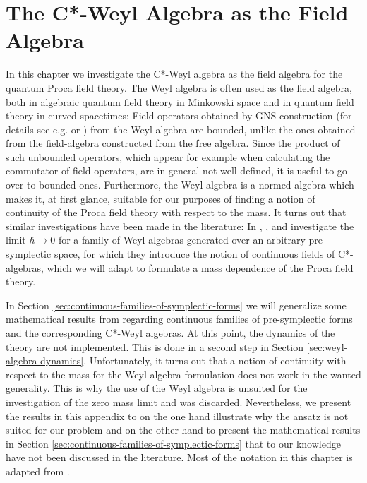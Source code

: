 \section{The C*-Weyl Algebra as the Field Algebra}\label{app:weyl-algebra}
In this chapter we investigate the C*-Weyl algebra as the field algebra for the quantum Proca field theory.  The Weyl algebra is often used as the field algebra, both in algebraic quantum field theory in Minkowski space and in quantum field theory in curved spacetimes: Field operators obtained by GNS-construction (for details see e.g. \cite[Chapter III.]{haag} or \cite[Chapter III.14]{fragoulopoulou}) from the Weyl algebra are bounded, unlike the ones obtained from the field-algebra constructed from the free algebra. Since the product of such unbounded operators, which appear for example when calculating the commutator of field operators, are in general not well defined, it is useful to go over to bounded ones. Furthermore, the Weyl algebra is a normed algebra which makes it, at first glance, suitable for our purposes of finding a notion of continuity of the Proca field theory with respect to the mass. It turns out that similar investigations have been made in the literature:  In \cite{rieckers_honegger_deformation}, ,  and  investigate the limit $\hbar \to 0$ for a family of Weyl algebras generated over an arbitrary pre-symplectic space, for which they introduce the notion of continuous fields of C*-algebras, which we will adapt to formulate a mass dependence of the Proca field theory.\par
%
In Section \ref{sec:continuous-families-of-symplectic-forms} we will generalize some mathematical results from \cite{rieckers_honegger_deformation} regarding continuous families of pre-symplectic forms and the corresponding C*-Weyl algebras. At this point, the dynamics of the theory are not implemented. This is done in a second step in Section \ref{sec:weyl-algebra-dynamics}. Unfortunately, it turns out that a notion of continuity with respect to the mass for the Weyl algebra formulation does not work in the wanted generality. This is why the use of the Weyl algebra is unsuited for the investigation of the zero mass limit and was discarded. Nevertheless, we present the results in this appendix to on the one hand illustrate why the ansatz is not suited for our problem and on the other hand to present the mathematical results in Section \ref{sec:continuous-families-of-symplectic-forms} that to our knowledge have not been discussed in the literature.
%
Most of the notation in this chapter is adapted from \cite{rieckers_honegger_deformation}.
%
%
%
%
%
